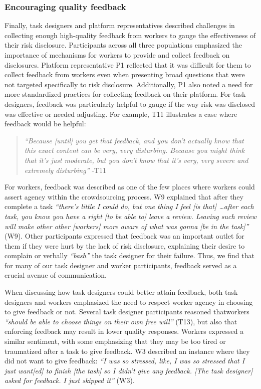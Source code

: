 \subsubsection{Encouraging quality feedback}
Finally, task designers and platform representatives described challenges in collecting enough high-quality feedback from workers to gauge the effectiveness of their risk disclosure. 
Participants across all three populations emphasized the importance of mechanisms for workers to provide and collect feedback on disclosures. Platform representative P1 reflected that it was difficult for them to collect feedback from workers even when presenting broad questions that were not targeted specifically to risk disclosure. Additionally, P1 also noted a need for more standardized practices for collecting feedback on their platform. For task designers, feedback was particularly helpful to gauge if the way risk was disclosed was effective or needed adjusting. For example, T11 illustrates a case where feedback would be helpful: 
\begin{quote}
    \textit{``Because [until] you get that feedback, and you don't actually know that this exact content can be very, very disturbing. Because you might think that it's just moderate, but you don't know that it's very, very severe and extremely disturbing''} -T11
\end{quote}
 For workers, feedback was described as one of the few places where workers could assert agency within the crowdsourcing process. W9 explained that after they complete a task \textit{``there's little I could do, but one thing I feel [is that] \dots after each task, you know you have a right [to be able to] leave a review. Leaving such review will make other other [workers] more aware of what was gonna [be in the task]''} (W9). Other participants expressed that feedback was an important outlet for them if they were hurt by the lack of risk disclosure, explaining their desire to complain or verbally \textit{``bash''} the task designer for their failure. Thus, we find that for many of our task designer and worker participants, feedback served as a crucial avenue of communication.


When discussing how task designers could better attain feedback, both task designers and workers emphasized the need to respect worker agency in choosing to give feedback or not. Several task designer participants reasoned thatworkers \textit{``should be able to choose things on their own free will''} (T13), but also that enforcing feedback may result in lower quality responses. Workers expressed a similar sentiment, with some emphasizing that they may be too tired or traumatized after a task to give feedback. W3 described an instance where they did not want to give feedback: \textit{``I was so stressed, like, I was so stressed that I just want[ed] to finish [the task] so I didn't give any feedback. [The task designer] asked for feedback. I just skipped it''} (W3). 

